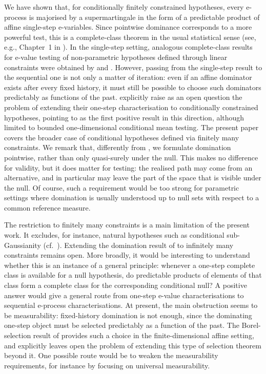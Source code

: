 \documentclass[10pt, a4paper]{article}
\begin{document}
We have shown that, for conditionally finitely constrained hypotheses, every e-process is majorised by a supermartingale in the form of a predictable product of affine single-step e-variables. Since pointwise dominance corresponds to a more powerful  test, this is a complete-class theorem in the usual statistical sense (see, e.g., Chapter~1 in \citealt{lehmann2005testing}). In the single-step setting, analogous complete-class results for e-value testing of non-parametric hypotheses defined through linear constraints were obtained by \citet{clerico2024optimal} and \citet{larsson2026testing}. However, passing from the single-step result to the sequential one is not only a matter of iteration: even if an affine dominator exists after every fixed history, it must still be possible to choose such dominators predictably as functions of the past. \citet{larsson2026testing} explicitly raise as an open question the problem of extending their one-step characterisation to conditionally constrained hypotheses, pointing to \citet{clerico2025optimality} as the first positive result in this direction, although limited to bounded one-dimensional conditional mean testing. The present paper covers the broader case of conditional hypotheses defined via finitely many constraints. We remark that, differently from \cite{larsson2026testing}, we formulate domination pointwise, rather than only quasi-surely under the null. This makes no difference for validity,  but it does matter for testing: the realised path may come from an alternative, and in particular may leave the part of the space that is visible under the null. Of course, such a requirement would be too strong for parametric settings where domination is usually understood  up to null sets with respect to a common reference measure.

The restriction to finitely many constraints is a main limitation of the present work. It excludes, for instance, natural hypotheses such as conditional sub-Gaussianity (cf.~\citealp{larsson2026testing}). Extending the domination result of   to infinitely many constraints remains open. More broadly, it would be interesting to understand whether this is an instance of a general principle: whenever a one-step complete class is available for a null hypothesis, do predictable products of elements of that class form a complete class for the corresponding conditional null? A positive answer would give a general route from one-step e-value characterisations to sequential e-process characterisations. At present, the main obstruction seems to be measurability: fixed-history domination is not enough, since the dominating one-step object must be selected predictably as a function of the past. The Borel-selection result of \citet{clerico2026borel} provides such a choice in the finite-dimensional affine setting, and explicitly leaves open the problem of extending this type of selection theorem beyond it. One possible route would be to weaken the measurability requirements, for instance by focusing on universal measurability.
\end{document}
